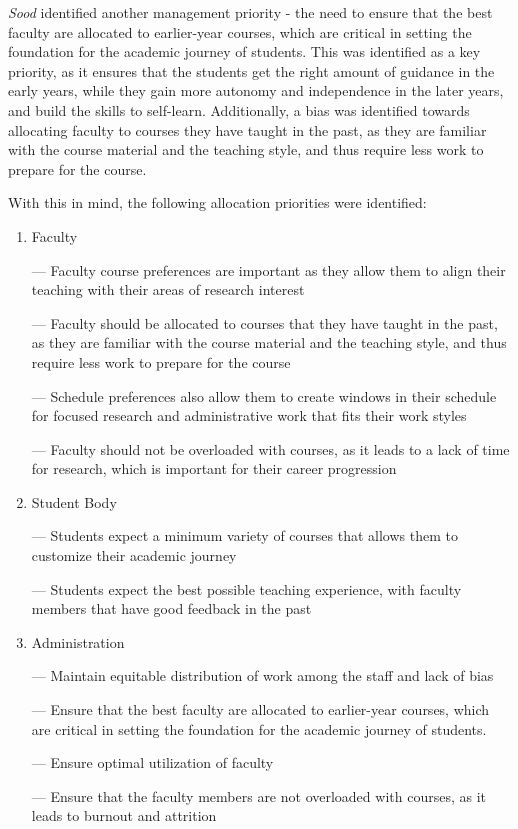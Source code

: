 \textit{Sood} \cite{rohan2017} identified another management priority - the need to ensure that the best faculty are allocated to earlier-year courses, which are critical in setting the foundation for the academic journey of students. This was identified as a key priority, as it ensures that the students get the right amount of guidance in the early years, while they gain more autonomy and independence in the later years, and build the skills to self-learn. Additionally, a bias was identified towards allocating faculty to courses they have taught in the past, as they are familiar with the course material and the teaching style, and thus require less work to prepare for the course.

With this in mind, the following allocation priorities were identified:

\begin{enumerate}
  \item Faculty

        — Faculty course preferences are important as they allow them to align their teaching with their areas of research interest

        — Faculty should be allocated to courses that they have taught in the past, as they are familiar with the course material and the teaching style, and thus require less work to prepare for the course

        — Schedule preferences also allow them to create windows in their schedule for focused research and administrative work that fits their work styles

        — Faculty should not be overloaded with courses, as it leads to a lack of time for research, which is important for their career progression

  \item Student Body

        — Students expect a minimum variety of courses that allows them to customize their academic journey

        — Students expect the best possible teaching experience, with faculty members that have good feedback in the past

  \item Administration

        — Maintain equitable distribution of work among the staff and lack of bias

        — Ensure that the best faculty are allocated to earlier-year courses, which are critical in setting the foundation for the academic journey of students.

        — Ensure optimal utilization of faculty

        — Ensure that the faculty members are not overloaded with courses, as it leads to burnout and attrition

\end{enumerate}

